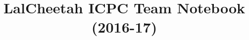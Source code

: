 \documentclass[10pt]{article}
\title{\vspace{-4ex}\Large{LalCheetah ICPC Team Notebook (2016-17)}}
\author{}
\date{}
\begin{document}
\begin{landscape}
\begin{multicols}{3}

\maketitle
\vspace{-13ex}
\tableofcontents
\pagestyle{fancy}



\end{multicols}
\end{landscape}
\end{document}
